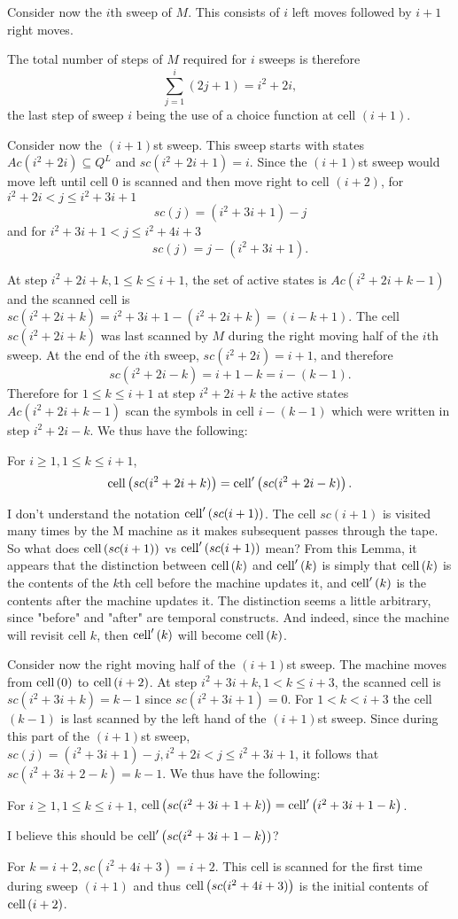 Consider now the $i$th sweep of $M$.
This consists of $i$ left moves followed by $i+1$ right moves.

The total number of steps of $M$ required for $i$ sweeps is therefore
\[
    \sum_{j=1}^{i} (2j+1) = i^2 + 2i,
\]
the last step of sweep $i$ being the use of a choice function at cell $(i+1)$.

Consider now the $(i+1)$st sweep.
This sweep starts with states $Ac(i^2+2i) \subseteq Q^L$ and $sc(i^2+2i+1) = i$.
Since the $(i+1)$st sweep would move left until cell 0 is scanned and then move
right to cell $(i+2)$, for $i^2 + 2i < j \leq i^2 + 3i + 1$
\[
    sc(j) = (i^2+3i+1) - j
\]
and for $i^2+3i+1 < j \leq i^2+4i+3$
\[
    sc(j) = j - (i^2+3i+1).
\]


At step $i^2 + 2i + k, 1 \leq k \leq i+1$, the set of active states is $Ac(i^2+2i+k-1)$ and the scanned
cell is $sc(i^2+2i+k) = i^2 + 3i + 1 - (i^2 + 2i +k) = (i - k + 1)$.
The cell $sc(i^2+2i+k)$ was last scanned by $M$ during the right moving half of the $i$th sweep.
At the end of the $i$th sweep, $sc(i^2+2i) = i+1$, and therefore
\[
    sc(i^2+2i-k) = i + 1 - k = i - (k - 1).
\]
Therefore for $1 \leq k \leq i+1$ at step $i^2 + 2i +k$ the active states $Ac(i^2+2i+k-1)$ scan the
symbols in cell $i - (k-1)$ which were written in step $i^2+2i-k$.
We thus have the following:
\begin{lemma}
    For $i \geq 1, 1 \leq k \leq i+1$,
    \[
        \mathrm{cell}\left(sc(i^2+2i+k)\right) = \mathrm{cell}'\left(sc(i^2+2i-k)\right).
    \]
\end{lemma}

\begin{error}
    I don't understand the notation $\mathrm{cell}'\left(sc(i+1)\right)$.
    The cell $sc(i+1)$ is visited many times by the
    M machine as it makes subsequent passes through the tape.
    So what does $\mathrm{cell}\left(sc(i+1)\right)$ vs $\mathrm{cell}'\left(sc(i+1)\right)$ mean?
    From this Lemma, it appears that the distinction between
    $\mathrm{cell}\left(k\right)$ and $\mathrm{cell}'\left(k\right)$ is simply that $\mathrm{cell}\left(k\right)$ is the
    contents of the $k$th cell before the machine updates it, and
    $\mathrm{cell}'\left(k\right)$ is the contents after the machine updates it.
    The distinction seems a little arbitrary, since "before" and "after"
    are temporal constructs.
    And indeed, since the machine will revisit cell $k$, then
    $\mathrm{cell}'\left(k\right)$ will become $\mathrm{cell}\left(k\right)$.
\end{error}

Consider now the right moving half of the $(i+1)$st sweep.
The machine moves from $\mathrm{cell}\left(0\right)$ to $\mathrm{cell}\left(i+2\right)$.
At step $i^2 + 3i + k, 1 < k \leq i+3$, the scanned cell is
$sc(i^2+3i+k) = k - 1$ since $sc(i^2+3i+1) = 0$.
For $1 < k < i+3$ the cell $(k-1)$ is last scanned by the left
hand of the $(i+1)$st sweep.
Since during this part of the $(i+1)$st sweep,
$sc(j) = (i^2+3i+1) - j, i^2+2i < j \leq i^2 + 3i + 1$, it follows
that $sc(i^2+3i+2-k) = k-1$.
We thus have the following:
\begin{lemma}
    For $i\geq 1, 1 \leq k \leq i+1$, $\mathrm{cell}\left(sc(i^2+3i+1+k)\right) = \mathrm{cell}'\left(i^2+3i+1-k\right)$.
\end{lemma}
\begin{error}
  I believe this should be $\mathrm{cell}'\left(sc(i^2+3i+1-k\right))$?
\end{error}

For $k=i+2, sc(i^2+4i+3) = i+2$.
This cell is scanned for the first time during sweep $(i+1)$ and thus $\mathrm{cell}\left(sc(i^2+4i+3)\right)$ is
the initial contents of $\mathrm{cell}\left(i+2\right)$.
